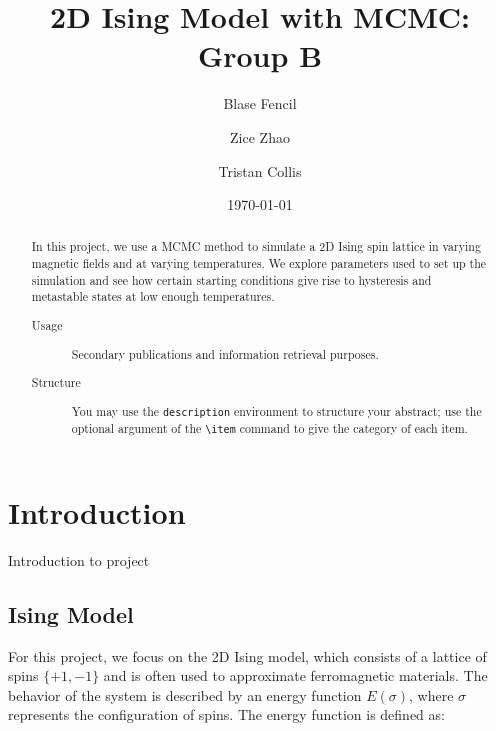 \documentclass[%
 reprint,
 amsmath,amssymb,
 aps,
]{revtex4-2}
\begin{document}

\title{2D Ising Model with MCMC:\\Group B}%

\author{Blase Fencil}
\author{Zice Zhao}%
\author{Tristan Collis}

\date{\today}%

\begin{abstract}
In this project, we use a MCMC method to simulate a 2D Ising spin lattice in varying 
magnetic fields and at varying temperatures. We explore parameters used to set up the 
simulation and see how certain starting conditions give rise to hysteresis and metastable 
states at low enough temperatures.
\begin{description}
\item[Usage]
Secondary publications and information retrieval purposes.
\item[Structure]
You may use the \texttt{description} environment to structure your abstract;
use the optional argument of the \verb+\item+ command to give the category of each item. 
\end{description}
\end{abstract}

\maketitle


\section{\label{sec:level1}Introduction}

Introduction to project 

\subsection{\label{sec:level2}Ising Model}

For this project, we focus on the 2D Ising model, which consists of a lattice of spins $\{+1, -1\}$ and is often used to approximate ferromagnetic materials. The behavior of the system is described by an energy function $E(\sigma)$, where $\sigma$ represents the configuration of spins. The energy function is defined as:
\end{document}
